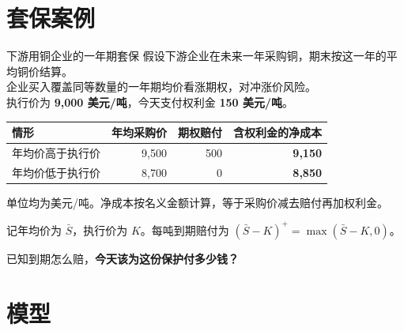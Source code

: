\begin{frame}
\titlepage
\end{frame}

\section{套保案例}

\begin{frame}{下游用铜企业的一年期套保}
假设下游企业在未来一年采购铜，期末按这一年的平均铜价结算。\\
企业买入覆盖同等数量的一年期均价看涨期权，对冲涨价风险。\\[3mm]
执行价为 \textbf{9,000 美元/吨}，今天支付权利金 \textbf{150 美元/吨}。

\medskip
\begin{center}
\setlength{\tabcolsep}{12pt}
\renewcommand{\arraystretch}{1.35}
\begin{tabular}{lrrr}
\toprule
情形 & 年均采购价 & 期权赔付 & 含权利金的净成本 \\
\midrule
年均价高于执行价 & 9,500 & 500 & \textbf{9,150} \\
年均价低于执行价 & 8,700 & 0 & \textbf{8,850} \\
\bottomrule
\end{tabular}
\end{center}
{\fontsize{14}{18}\selectfont 单位均为美元/吨。净成本按名义金额计算，等于采购价减去赔付再加权利金。}

\medskip
记年均价为 \(\bar S\)，执行价为 \(K\)。每吨到期赔付为 \((\bar S-K)^+=\max(\bar S-K,0)\)。

\medskip
已知到期怎么赔，\textbf{今天该为这份保护付多少钱？}
\end{frame}

\section{模型}

